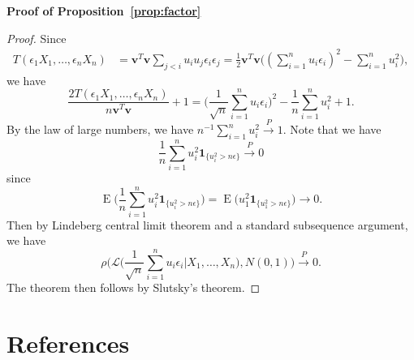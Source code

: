 \documentclass[review]{elsarticle}
\DeclareMathOperator{\myE}{E}
\newcommand{\Bv}{\mathbf{v}}
\theoremstyle{plain}
\theoremstyle{definition}
\theoremstyle{remark}
\begin{document}
\textbf{Proof of Proposition~\ref{prop:factor}}
\begin{proof}
    Since
\begin{equation*}
    \begin{aligned}
        T(\epsilon_1 X_1,\ldots,\epsilon_n X_n)&=\Bv^T \Bv\sum_{j<i}  u_i u_j \epsilon_i \epsilon_j
        =\frac{1}{2}\Bv^T \Bv\big( (\sum_{i=1}^n u_i \epsilon_i )^2-\sum_{i=1}^n u_i^2\big),
    \end{aligned}
\end{equation*}
we have
    \begin{equation*}
\frac{2T(\epsilon_1 X_1,\ldots,\epsilon_n X_n)}{n\Bv^T \Bv}+1=
         \big(\frac{1}{\sqrt{n}}\sum_{i=1}^n u_i \epsilon_i \big)^2-\frac{1}{n}\sum_{i=1}^n u_i^2+ 1.
    \end{equation*}
    By the law of large numbers, we have $n^{-1}\sum_{i=1}^n u_i^2\xrightarrow{P} 1$.
    Note that we have
    \begin{equation*}
        \frac{1}{n} \sum_{i=1}^n u_i^2\mathbf{1}_{\{u_i^2>n\epsilon\}}\xrightarrow{P}0
    \end{equation*}
    since
    \begin{equation*}
        \myE\Big(\frac{1}{n} \sum_{i=1}^n u_i^2\mathbf{1}_{\{u_i^2>n\epsilon\}}\Big)
        =
        \myE \big( u_1^2\mathbf{1}_{\{u_1^2>n\epsilon\}}\big)\to 0.
    \end{equation*}
    Then by Lindeberg central limit theorem and a standard subsequence argument, we have
    \begin{equation*}
        \rho\Big(\mathcal{L}\big(\frac{1}{\sqrt{n}}\sum_{i=1}^n u_i \epsilon_i \big|X_1,\ldots,X_n\big),N(0,1)\Big)\xrightarrow{P}0.
    \end{equation*}
The theorem then follows by Slutsky's theorem.

\end{proof}





\section*{References}

\end{document}
